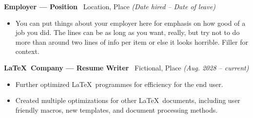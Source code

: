 \documentclass[class=article, crop=false]{standalone}
\begin{document}
\textbf{Employer --- Position} \textbar\ Location, Place 
\hfill \textsl{(Date hired -- Date of leave)} 
\begin{itemize}[leftmargin=*]
    \item You can put things about your employer here for emphasis on how good 
          of a job you did. The lines can be as long as you want, really, but 
          try not to do more than around two lines of info per item or else it 
          looks horrible. Filler for context.
\end{itemize}

\split

\textbf{\LaTeX\ Company --- Resume Writer} \textbar\ Fictional, Place
\hfill \textsl{(Aug. 2028 -- current)}
\begin{itemize}[leftmargin=*]
    \item Further optimized \LaTeX\ programmes for efficiency for the end user.
    \item Created multiple optimizations for other \LaTeX\ documents, including
          user friendly macros, new templates, and document processing methods.
\end{itemize}
\end{document}
